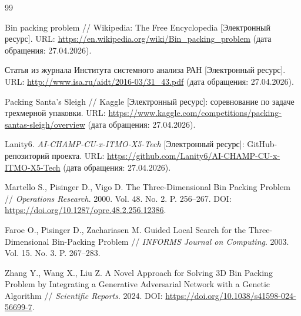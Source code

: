 \documentclass[14pt,a4paper]{extarticle}
\makeatletter
\providecommand{\@refsname}{СПИСОК ИСПОЛЬЗОВАННЫХ ИСТОЧНИКОВ}
\makeatother
\begin{document}
\makeatletter
\renewcommand{\refname}{\@refsname}
\makeatother
\begin{thebibliography}{99}

Bin packing problem // Wikipedia: The Free Encyclopedia [Электронный ресурс]. URL: \url{https://en.wikipedia.org/wiki/Bin_packing_problem} (дата обращения: 27.04.2026).

Статья из журнала Института системного анализа РАН [Электронный ресурс]. URL: \url{http://www.isa.ru/aidt/2016-03/31_43.pdf} (дата обращения: 27.04.2026).

Packing Santa's Sleigh // Kaggle [Электронный ресурс]: соревнование по задаче трехмерной упаковки. URL: \url{https://www.kaggle.com/competitions/packing-santas-sleigh/overview} (дата обращения: 27.04.2026).

Lanity6. \textit{AI-CHAMP-CU-x-ITMO-X5-Tech} [Электронный ресурс]: GitHub-репозиторий проекта. URL: \url{https://github.com/Lanity6/AI-CHAMP-CU-x-ITMO-X5-Tech} (дата обращения: 27.04.2026).

Martello S., Pisinger D., Vigo D. The Three-Dimensional Bin Packing Problem // \textit{Operations Research}. 2000. Vol. 48. No. 2. P. 256--267. DOI: \url{https://doi.org/10.1287/opre.48.2.256.12386}.

Faroe O., Pisinger D., Zachariasen M. Guided Local Search for the Three-Dimensional Bin-Packing Problem // \textit{INFORMS Journal on Computing}. 2003. Vol. 15. No. 3. P. 267--283.

Zhang Y., Wang X., Liu Z. A Novel Approach for Solving 3D Bin Packing Problem by Integrating a Generative Adversarial Network with a Genetic Algorithm // \textit{Scientific Reports}. 2024. DOI: \url{https://doi.org/10.1038/s41598-024-56699-7}.

\end{thebibliography}
\end{document}
